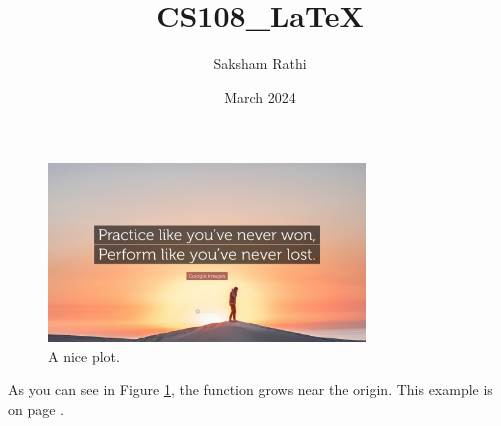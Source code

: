 \documentclass{article}
\title{CS108\_LaTeX}
\author{Saksham Rathi}
\date{March 2024}
\begin{document}
\maketitle

\begin{figure}[h]
    \centering
    \includegraphics[width=0.75\textwidth]{7473766-Google-images-Quote-Practice-like-you-ve-never-won-Perform-like.jpg}
    \caption{A nice plot.}
    \label{fig:mesh1}
\end{figure}

As you can see in Figure \ref{fig:mesh1}, the function grows near the origin. This example is on page \pageref{fig:mesh1}.

\end{document}
